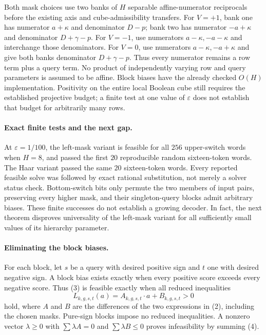 \documentclass{article}
\begin{document}
Both mask choices use two banks of $H$ separable affine-numerator
reciprocals before the existing axis and cube-admissibility transfers.
For $V=+1$, bank one has numerator $a+\kappa$ and denominator $D-p$;
bank two has numerator $-a+\kappa$ and denominator $D+\gamma-p$.
For $V=-1$, use numerators $a-\kappa,-a-\kappa$ and interchange those
denominators.  For $V=0$, use numerators $a-\kappa,-a+\kappa$ and give
both banks denominator $D+\gamma-p$.  Thus every numerator remains a
row term plus a query term.  No product of independently varying row and
query parameters is assumed to be affine.  Block biases have the already
checked $O(H)$ implementation.  Positivity on the entire local Boolean
cube still requires the established projective budget; a finite test at
one value of $\varepsilon$ does not establish that budget for arbitrarily
many rows.

\paragraph{Exact finite tests and the next gap.}
At $\varepsilon=1/100$, the left-mask variant is feasible for all $256$
upper-switch words when $H=8$, and passed the first $20$ reproducible
random sixteen-token words.  The Haar variant passed the same $20$
sixteen-token words.  Every reported feasible solve was followed by exact
rational substitution, not merely a solver status check.  Bottom-switch
bits only permute the two members of input pairs, preserving every higher
mask, and their singleton-query blocks admit arbitrary biases.
These finite successes do not establish a growing decoder.
In fact, the next theorem disproves universality of the left-mask variant
for all sufficiently small values of its hierarchy parameter.

\paragraph{Eliminating the block biases.}
For each block, let $s$ be a query with desired positive sign and $t$ one
with desired negative sign.  A block bias exists exactly when every
positive score exceeds every negative score.  Thus (3) is feasible
exactly when all reduced inequalities
\[
 L_{k,g,s,t}(a)=A_{k,g,s,t}\cdot a+B_{k,g,s,t}>0
 \tag{4}
\]
hold, where $A$ and $B$ are the differences of the two expressions in
(2), including the chosen masks.  Pure-sign blocks impose no reduced
inequalities.  A nonzero vector $\lambda\geq0$ with
$\sum\lambda A=0$ and $\sum\lambda B\leq0$ proves infeasibility by
summing (4).
\end{document}
